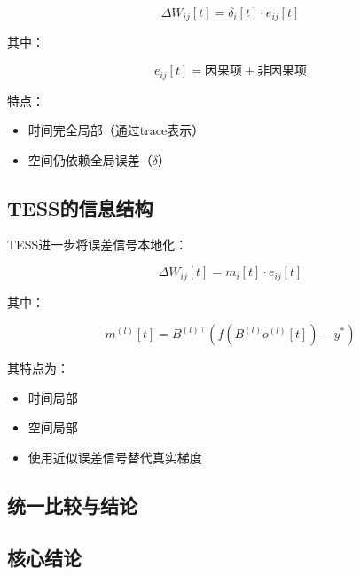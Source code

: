 \documentclass[journal,12pt,onecolumn]{IEEEtran}
\begin{document}
\begin{equation}
\Delta W_{ij}[t] = \delta_i[t] \cdot e_{ij}[t]
\end{equation}

其中：

\begin{equation}
e_{ij}[t] =
\text{因果项} + \text{非因果项}
\end{equation}



特点：

\begin{itemize}
\item 时间完全局部（通过trace表示）
\item 空间仍依赖全局误差（$\delta$）
\end{itemize}



\subsection{TESS的信息结构}

TESS进一步将误差信号本地化：

\begin{equation}
\Delta W_{ij}[t] = m_i[t] \cdot e_{ij}[t]
\end{equation}

其中：

\begin{equation}
m^{(l)}[t] = B^{(l)\top} \left( f(B^{(l)} o^{(l)}[t]) - y^* \right)
\end{equation}



其特点为：

\begin{itemize}
\item 时间局部
\item 空间局部
\item 使用近似误差信号替代真实梯度
\end{itemize}



\subsection{统一比较与结论}




\subsection{核心结论}
\end{document}
